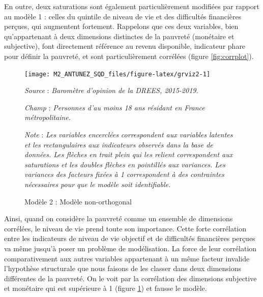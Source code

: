 \documentclass[12pt,a4paper]{reedthesis}
\begin{document}
En outre, deux saturations sont également particulièrement modifiées par rapport au modèle 1 : celles du quintile de niveau de vie et des difficultés financières perçues, qui augmentent fortement. Rappelons que ces deux variables, bien qu'appartenant à deux dimensions distinctes de la pauvreté (monétaire et subjective), font directement référence au revenu disponible, indicateur phare pour définir la pauvreté, et sont particulièrement corrélées (figure \ref{fig:corrplot}).
\begin{figure}[!ht]

{\centering \texttt{[image: M2\_ANTUNEZ\_SQD\_files/figure-latex/grviz2-1]} 

}

\caption[Modèle 2 ]{Modèle 2 : Modèle non-orthogonal}\label{fig:grviz2}

\footnotesize


\emph{Source} : \emph{Baromètre d’opinion de la DREES, 2015-2019.}


\emph{Champ} : \emph{Personnes d’au moins 18 ans résidant en France métropolitaine.}


\emph{Note} : \emph{Les variables encerclées correspondent aux variables latentes et les rectangulaires aux indicateurs observés dans la base de données. Les flèches en trait plein qui les relient correspondent aux saturations et les doubles flèches en pointillés aux variances. Les variances des facteurs fixées à 1 correspondent à des contraintes nécessaires pour que le modèle soit identifiable.}
\normalsize\end{figure}

Ainsi, quand on considère la pauvreté comme un ensemble de dimensions corrélées, le niveau de vie prend toute son importance. Cette forte corrélation entre les indicateurs de niveau de vie objectif et de difficultés financières perçues va même jusqu'à poser un problème de modélisation. La force de leur corrélation comparativement aux autres variables appartenant à un même facteur invalide l'hypothèse structurale que nous faisons de les classer dans deux dimensions différentes de la pauvreté. On le voit par la corrélation des dimensions subjective et monétaire qui est supérieure à 1 (figure \ref{fig:grviz2}) et fausse le modèle.
\end{document}
